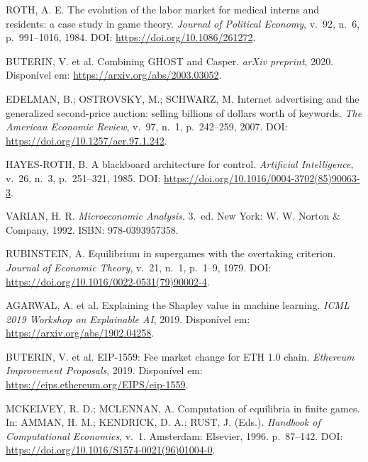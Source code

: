 \begin{enumerate}[{[1]}]
    \item \label{ref:roth1984} ROTH, A. E. The evolution of the labor market for medical interns and residents: a case study in game theory. \textit{Journal of Political Economy}, v.~92, n.~6, p.~991--1016, 1984. DOI: \url{https://doi.org/10.1086/261272}.
    
    \item \label{ref:buterin2020} BUTERIN, V. et al. Combining GHOST and Casper. \textit{arXiv preprint}, 2020. Disponível em: \url{https://arxiv.org/abs/2003.03052}.
    
    \item \label{ref:edelman2007} EDELMAN, B.; OSTROVSKY, M.; SCHWARZ, M. Internet advertising and the generalized second-price auction: selling billions of dollars worth of keywords. \textit{The American Economic Review}, v.~97, n.~1, p.~242--259, 2007. DOI: \url{https://doi.org/10.1257/aer.97.1.242}.
    
    \item \label{ref:hayes1985} HAYES-ROTH, B. A blackboard architecture for control. \textit{Artificial Intelligence}, v.~26, n.~3, p.~251--321, 1985. DOI: \url{https://doi.org/10.1016/0004-3702(85)90063-3}.
    
    \item \label{ref:varian1992} VARIAN, H. R. \textit{Microeconomic Analysis}. 3.~ed. New York: W. W. Norton \& Company, 1992. ISBN: 978-0393957358.
    
    \item \label{ref:rubinstein1979} RUBINSTEIN, A. Equilibrium in supergames with the overtaking criterion. \textit{Journal of Economic Theory}, v.~21, n.~1, p.~1--9, 1979. DOI: \url{https://doi.org/10.1016/0022-0531(79)90002-4}.
    
    \item \label{ref:agarwal2019} AGARWAL, A. et al. Explaining the Shapley value in machine learning. \textit{ICML 2019 Workshop on Explainable AI}, 2019. Disponível em: \url{https://arxiv.org/abs/1902.04258}.
    
    \item \label{ref:buterin2019} BUTERIN, V. et al. EIP-1559: Fee market change for ETH 1.0 chain. \textit{Ethereum Improvement Proposals}, 2019. Disponível em: \url{https://eips.ethereum.org/EIPS/eip-1559}.
    
    \item \label{ref:mckelvey1996} MCKELVEY, R. D.; MCLENNAN, A. Computation of equilibria in finite games. In: AMMAN, H. M.; KENDRICK, D. A.; RUST, J. (Eds.). \textit{Handbook of Computational Economics}, v.~1. Amsterdam: Elsevier, 1996. p.~87--142. DOI: \url{https://doi.org/10.1016/S1574-0021(96)01004-0}.
    

\end{enumerate}
